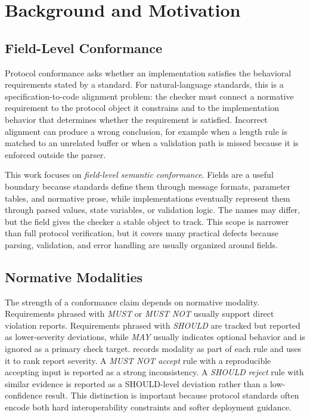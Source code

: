 \section{Background and Motivation}
\label{sec:background}

\subsection{Field-Level Conformance}

Protocol conformance asks whether an implementation satisfies the behavioral
requirements stated by a standard. For natural-language standards, this is a
specification-to-code alignment problem: the checker must connect a normative
requirement to the protocol object it constrains and to the implementation
behavior that determines whether the requirement is satisfied. Incorrect
alignment can produce a wrong conclusion, for example when a length rule is
matched to an unrelated buffer or when a validation path is missed because it is
enforced outside the parser.

This work focuses on \emph{field-level semantic conformance}. Fields are a
useful boundary because standards define them through message formats,
parameter tables, and normative prose, while implementations eventually
represent them through parsed values, state variables, or validation logic. The
names may differ, but the field gives the checker a stable object to track.
This scope is narrower than full protocol verification, but it covers many
practical defects because parsing, validation, and error handling are usually
organized around fields.

\subsection{Normative Modalities}

The strength of a conformance claim depends on normative modality. Requirements
phrased with \emph{MUST} or \emph{MUST NOT} usually support direct violation
reports. Requirements phrased with \emph{SHOULD} are tracked but reported as
lower-severity deviations, while \emph{MAY} usually indicates optional behavior
and is ignored as a primary check target. \tool{} records modality as part of
each rule and uses it to rank report severity. A \emph{MUST NOT accept} rule
with a reproducible accepting input is reported as a strong inconsistency. A
\emph{SHOULD reject} rule with similar evidence is reported as a SHOULD-level
deviation rather than a low-confidence result. This distinction is important
because protocol standards often encode both hard interoperability constraints
and softer deployment guidance.

